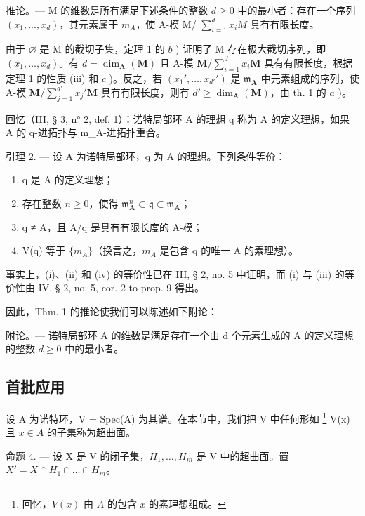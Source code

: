 推论。--- M 的维数是所有满足下述条件的整数 \(d \geqslant 0\) 中的最小者：存在一个序列 \((x_{1}, ..., x_{d})\)，其元素属于 \(m_{A}\)，使 A-模 M/ \(\sum_{i=1}^{d} x_{i}M\) 具有有限长度。

由于 \(\varnothing\) 是 M 的截切子集，定理 1 的 \(b\) ) 证明了 M 存在极大截切序列，即 \((x_{1},\ldots,x_{d})\)。有 \(d=\dim_{\mathbf{A}}(\mathbf{M})\) 且 A-模 \(\mathbf{M}/\sum_{i=1}^{d}x_{i}\mathbf{M}\) 具有有限长度，根据定理 1 的性质 (iii) 和 \(c\) )。反之，若 \((x_{1}',\ldots,x_{d'}')\) 是 \(\mathfrak{m}_{\mathbf{A}}\) 中元素组成的序列，使 A-模 \(\mathbf{M}/\sum_{j=1}^{d'}x_{j}'\mathbf{M}\) 具有有限长度，则有 \(d'\geqslant\dim_{\mathbf{A}}(\mathbf{M})\)，由 th. 1 的 \(a\) )。

回忆（III, § 3, n° 2, def. 1）：诺特局部环 A 的理想 q 称为 A 的定义理想，如果 A 的 q-进拓扑与 m\_A-进拓扑重合。

引理 2. --- 设 A 为诺特局部环，q 为 A 的理想。下列条件等价：

\begin{enumerate}
\def\labelenumi{(\roman{enumi})}
\item
  q 是 A 的定义理想；
\item
  存在整数 \(n \geqslant 0\)，使得 \(\mathfrak{m}_{\mathbf{A}}^{n} \subset \mathfrak{q} \subset \mathfrak{m}_{\mathbf{A}}\)；
\item
  q ≠ A，且 A/q 是具有有限长度的 A-模；
\item
  V(q) 等于 \(\{m_{A}\}\)（换言之，\(m_{A}\) 是包含 q 的唯一 A 的素理想）。
\end{enumerate}

事实上，(i)、(ii) 和 (iv) 的等价性已在 III, § 2, no. 5 中证明，而 (i) 与 (iii) 的等价性由 IV, § 2, no. 5, cor. 2 to prop. 9 得出。

因此，Thm. 1 的推论使我们可以陈述如下附论：

附论。--- 诺特局部环 A 的维数是满足存在一个由 d 个元素生成的 A 的定义理想的整数 \(d \geqslant 0\) 中的最小者。

\subsection{首批应用}

设 A 为诺特环，V = Spec(A) 为其谱。在本节中，我们把 V 中任何形如 \footnote{回忆，\(V(x)\) 由 \(A\) 的包含 \(x\) 的素理想组成。} V(x) 且 \(x \in A\) 的子集称为超曲面。

命题 4. --- 设 X 是 V 的闭子集，\(H_{1}, \ldots, H_{m}\) 是 V 中的超曲面。置 \(X' = X \cap H_{1} \cap \ldots \cap H_{m}\)。

